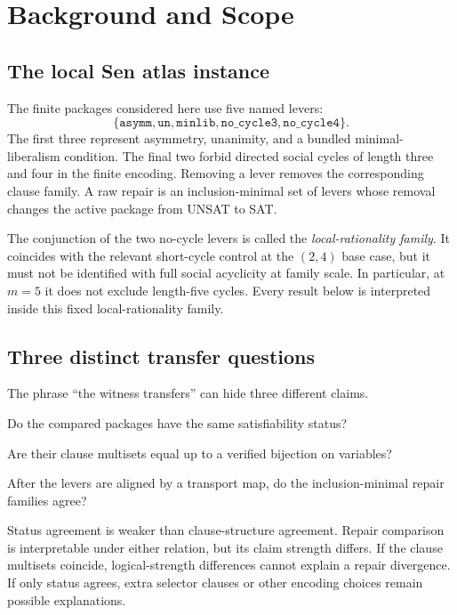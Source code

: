 \section{Background and Scope}\label{sec:background}

\subsection{The local Sen atlas instance}

The finite packages considered here use five named levers:
\[
  \{\mathtt{asymm},\mathtt{un},\mathtt{minlib},
    \mathtt{no\_cycle3},\mathtt{no\_cycle4}\}.
\]
The first three represent asymmetry, unanimity, and a bundled
minimal-liberalism condition.  The final two forbid directed social cycles of
length three and four in the finite encoding.  Removing a lever removes the
corresponding clause family.  A raw repair is an inclusion-minimal set of
levers whose removal changes the active package from UNSAT to SAT\@.

The conjunction of the two no-cycle levers is called the
\emph{local-rationality family}.  It coincides with the relevant short-cycle
control at the $(2,4)$ base case, but it must not be identified with full
social acyclicity at family scale.  In particular, at $m=5$ it does not exclude
length-five cycles.  Every result below is interpreted inside this fixed
local-rationality family.

\subsection{Three distinct transfer questions}

The phrase ``the witness transfers'' can hide three different claims.
\begin{description}[style=nextline,leftmargin=2.2em]
  \item[Status transfer.]
  Do the compared packages have the same satisfiability status?
  \item[Clause-structure transfer.]
  Are their clause multisets equal up to a verified bijection on variables?
  \item[Repair-presentation transfer.]
  After the levers are aligned by a transport map, do the inclusion-minimal
  repair families agree?
\end{description}
Status agreement is weaker than clause-structure agreement.  Repair comparison
is interpretable under either relation, but its claim strength differs.
If the clause multisets coincide, logical-strength differences cannot explain a
repair divergence.  If only status agrees, extra selector clauses or other
encoding choices remain possible explanations.

